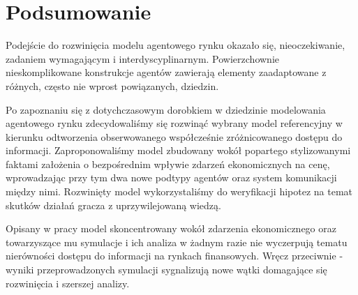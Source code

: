 \chapter*{Podsumowanie}

Podejście do rozwinięcia modelu agentowego rynku okazało się, nieoczekiwanie, zadaniem wymagającym i interdyscyplinarnym. Powierzchownie nieskomplikowane konstrukcje agentów zawierają elementy zaadaptowane z różnych, często nie wprost powiązanych, dziedzin. 

Po zapoznaniu się z dotychczasowym dorobkiem w dziedzinie modelowania agentowego rynku zdecydowaliśmy się rozwinąć wybrany model referencyjny w kierunku odtworzenia obserwowanego współcześnie zróżnicowanego dostępu do informacji. Zaproponowaliśmy model zbudowany wokół popartego stylizowanymi faktami założenia o bezpośrednim wpływie zdarzeń ekonomicznych na cenę, wprowadzając przy tym dwa nowe podtypy agentów oraz system komunikacji między nimi. Rozwinięty model wykorzystaliśmy do weryfikacji hipotez na temat skutków działań gracza z uprzywilejowaną wiedzą. 

Opisany w pracy model skoncentrowany wokół zdarzenia ekonomicznego oraz towarzyszące mu symulacje i ich analiza w żadnym razie nie wyczerpują tematu nierówności dostępu do informacji na rynkach finansowych. Wręcz przeciwnie - wyniki przeprowadzonych symulacji sygnalizują nowe wątki domagające się rozwinięcia i szerszej analizy. 